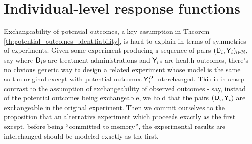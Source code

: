 



\section{Individual-level response functions}\label{sec:ilevel_ccontract}

Exchangeability of potential outcomes, a key assumption in Theorem \ref{th:potential_outcomes_identifiability}, is hard to explain in terms of symmetries of experiments. Given some experiment producing a sequence of pairs $(\mathsf{D}_i,\mathsf{Y}_i)_{i\in\mathbb{N}}$, say where $\mathsf{D}_i$s are treatment administrations and $\mathsf{Y}_i$s are health outcomes, there's no obvious generic way to design a related experiment whose model is the same as the original except with potential outcomes $\mathsf{Y}^D_i$ interchanged. This is in sharp contrast to the assumption of exchangeability of observed outcomes - say, instead of the potential outcomes being exchangeable, we hold that the pairs $(\mathsf{D}_i,\mathsf{Y}_i)$ are exchangeable in the original experiment. Then we commit ourselves to the proposition that an alternative experiment which proceeds exactly as the first except, before being ``committed to memory'', the experimental results are interchanged should be modeled exactly as the first.

